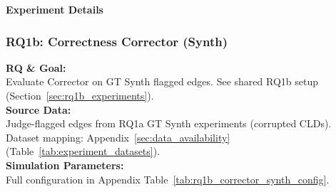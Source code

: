 \noindent\textbf{Experiment Details}

\subsubsection{RQ1b: Correctness Corrector (Synth)}
\label{sec:rq1b_corrector_synth}

\textbf{RQ \& Goal:}\\
Evaluate Corrector on GT Synth flagged edges. See shared RQ1b setup (Section~\ref{sec:rq1b_experiments}).\\
\textbf{Source Data:}\\
Judge-flagged edges from RQ1a GT Synth experiments (corrupted CLDs). Dataset mapping: Appendix~\ref{sec:data_availability} (Table~\ref{tab:experiment_datasets}).\\
\textbf{Simulation Parameters:}\\
Full configuration in Appendix Table~\ref{tab:rq1b_corrector_synth_config}.\\

